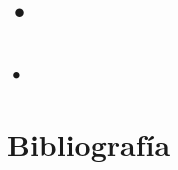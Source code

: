 \documentclass{{../slide}}
\title{}
\institute{Universidad Politécnica de Sinaloa}
\begin{document}
\Portada
\Indice


    \section{•}

\subsection{•}



\section{Bibliografía}

\begin{frame}
    
\end{frame}
\end{document}

